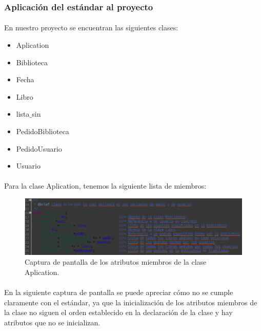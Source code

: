 		\subsubsection{Aplicación del estándar al proyecto}
		
			\paragraph{}En nuestro proyecto se encuentran las siguientes clases:
			
			\begin{itemize}
				\item Aplication
				\item Biblioteca
				\item Fecha
				\item Libro
				\item lista$\_$sin
				\item PedidoBiblioteca
				\item PedidoUsuario
				\item Usuario
			\end{itemize}
		
			\paragraph{}Para la clase Aplication, tenemos la siguiente lista de miembros:
			
			\begin{figure}[H]
				\centering
				\includegraphics[scale=0.55]{img/captura2.png}
				\caption{Captura de pantalla de los atributos miembros de la clase Aplication.}
				\label{captura2}
			\end{figure}
		
			\paragraph{}En la siguiente captura de pantalla se puede apreciar cómo no se cumple claramente con el estándar, ya que la inicialización de los atributos miembros de la clase no siguen el orden establecido en la declaración  de la clase y hay atributos que no se inicializan.
			
